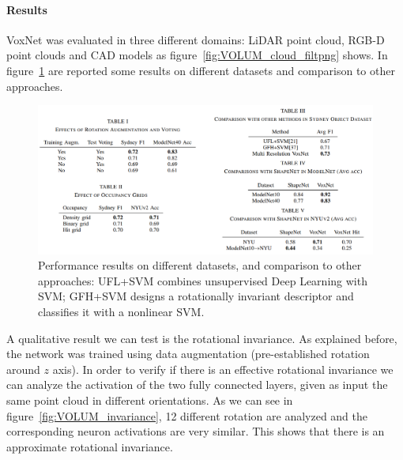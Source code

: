 \paragraph{Results}
VoxNet was evaluated in three different domains: LiDAR point cloud, RGB-D point clouds and CAD models as figure~\ref{fig:VOLUM_cloud_filtpng} shows. In figure~\ref{fig:VOLUM_results_table} are reported some results on different datasets and comparison to other approaches. 

\begin{figure}[ht]
    \centering
    \captionsetup{width=.9\linewidth}
    \includegraphics[width=\textwidth]{images/VOLUM_results_table.png}
    \caption{Performance results on different datasets, and comparison to other approaches: UFL+SVM combines unsupervised Deep Learning with SVM; GFH+SVM designs a rotationally invariant descriptor and classifies it with a nonlinear SVM. ~\cite{VoxNet}}
    \label{fig:VOLUM_results_table}
\end{figure}

A qualitative result we can test is the rotational invariance. As explained before, the network was trained using data augmentation (pre-established rotation around $z$ axis). In order to verify if there is an effective rotational invariance we can analyze the activation of the two fully connected layers, given as input the same point cloud in different orientations. As we can see in figure~\ref{fig:VOLUM_invariance}, 12 different rotation are analyzed and the corresponding neuron activations are very similar. This shows that there is an approximate rotational invariance.